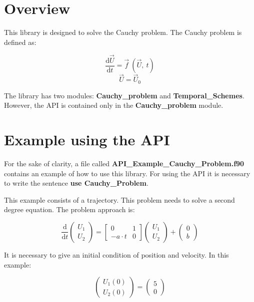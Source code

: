 \section{Overview}

This library is designed to solve the Cauchy problem. The Cauchy problem is defined as:

\begin{equation*}
\frac{\text{d}\vec{U}}{\text{d}t}=\vec{f}\ (\vec{U},\ t) 
\end{equation*}
\begin{equation*}
\vec{U}=\vec{U}_0
\end{equation*}

The library has two modules: \textbf{Cauchy\_problem} and \textbf{Temporal\_Schemes}. However, the API is contained only in the \textbf{Cauchy\_problem} module.

\section{Example using the API}

For the sake of clarity, a file called \textbf{API\_Example\_Cauchy\_Problem.f90} contains an example of how to use this library. For using the API it is necessary to write the sentence \textbf{use Cauchy\_Problem}. 

This example consists of a trajectory. This problem needs to solve a second degree equation. The problem approach is:

\begin{equation*}
\frac{\text{d}}{\text{d}t}\begin{pmatrix}
U_{1}\\
U_{2}
\end{pmatrix}
=
\begin{bmatrix}
0 & 1 \\
-a \cdot t & 0
\end{bmatrix}
\begin{pmatrix}
U_{1} \\
U_{2}
\end{pmatrix}
+
\begin{pmatrix}
0 \\
b
\end{pmatrix}
\end{equation*}

It is necessary to give an initial condition of position and velocity. In this example:

\begin{equation*}
\begin{pmatrix}
U_{1}(0)\\
U_{2}(0)
\end{pmatrix}
=
\begin{pmatrix}
5 \\
0
\end{pmatrix}
\end{equation*}

